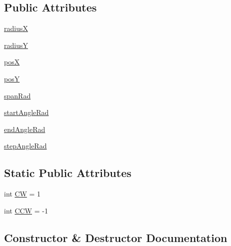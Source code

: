 \subsection*{Public Attributes}
\begin{DoxyCompactItemize}
\item 
\hyperlink{classguidecircle_1_1GuideCircle_a1a3a04d7fcc8ca14e2b9ad035cfb75fd}{radius\+X}
\item 
\hyperlink{classguidecircle_1_1GuideCircle_a658078f6c2cd8c574ebd9ae63ad4f0ab}{radius\+Y}
\item 
\hyperlink{classguidecircle_1_1GuideCircle_a46e0f2fbdb5c903b6aec1c7102f1bea5}{pos\+X}
\item 
\hyperlink{classguidecircle_1_1GuideCircle_aaa28ba2ddbe3712711f79e7636f17ddd}{pos\+Y}
\item 
\hyperlink{classguidecircle_1_1GuideCircle_a4d91ff57445471f8783b4c7272ebbb7f}{span\+Rad}
\item 
\hyperlink{classguidecircle_1_1GuideCircle_afdb8bd566f7bc0f1a7a34becec280af9}{start\+Angle\+Rad}
\item 
\hyperlink{classguidecircle_1_1GuideCircle_a2ffdd5517dd47e50ff3748e34d1e8fe6}{end\+Angle\+Rad}
\item 
\hyperlink{classguidecircle_1_1GuideCircle_a76d99fe4ff08b112b80362de30bc9b94}{step\+Angle\+Rad}
\end{DoxyCompactItemize}
\subsection*{Static Public Attributes}
\begin{DoxyCompactItemize}
\item 
int \hyperlink{classguidecircle_1_1GuideCircle_a772087d315213d786060ba5ce48f6beb}{C\+W} = 1
\item 
int \hyperlink{classguidecircle_1_1GuideCircle_afc3e00e354f190533192631737fa766f}{C\+C\+W} = -\/1
\end{DoxyCompactItemize}


\subsection{Constructor \& Destructor Documentation}
\hypertarget{classguidecircle_1_1GuideCircle_a4ddf3ffdbdcc8501961995781483f0c1}{}
